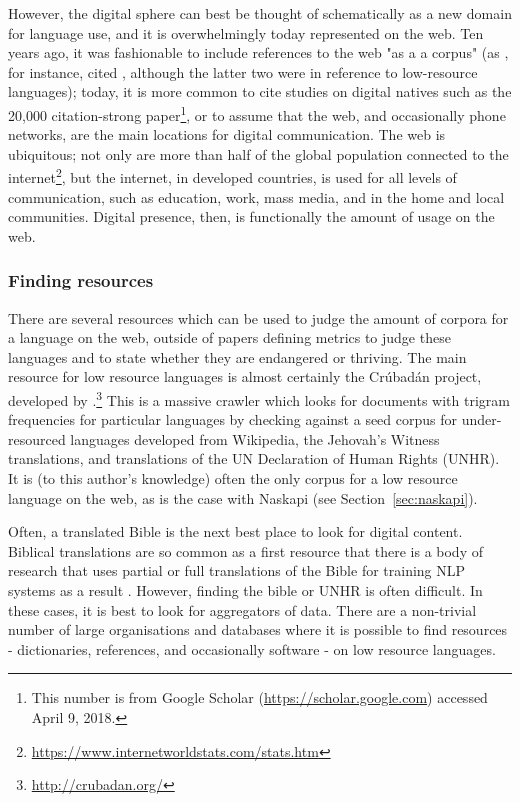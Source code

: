 However, the digital sphere can best be thought of schematically as a new domain for language use, and it is overwhelmingly today represented on the web. Ten years ago, it was fashionable to include references to the web "as a a corpus" (as \citet{scannell2007crubadan}, for instance, cited \citep{resnik1999mining, ghani2001mining, kilgarriff2001web}, although the latter two were in reference to low-resource languages); today, it is more common to cite studies on digital natives such as the 20,000 citation-strong \citet{prensky2001digital} paper\footnote{This number is from Google Scholar (\href{https://scholar.google.com}{https://scholar.google.com}) accessed April 9, 2018.}, or to assume that the web, and occasionally phone networks, are the main locations for digital communication. The web is ubiquitous; not only are more than half of the global population connected to the internet\footnote{\href{https://www.internetworldstats.com/stats.htm}{https://www.internetworldstats.com/stats.htm}}, but the internet, in developed countries, is used for all levels of communication, such as education, work, mass media, and in the home and local communities. Digital presence, then, is functionally the amount of usage on the web.

\subsubsection{Finding resources}
\label{subsec:finding-resources}

There are several resources which can be used to judge the amount of corpora for a language on the web, outside of papers defining metrics to judge these languages and to state whether they are endangered or thriving. The main resource for low resource languages is almost certainly the Cr\'ubad\'an project, developed by \citet{scannell2007crubadan}.\footnote{\href{http://crubadan.org/}{http://crubadan.org/}} This is a massive crawler which looks for documents with trigram frequencies for particular languages by checking against a seed corpus for under-resourced languages developed from Wikipedia, the Jehovah's Witness translations, and translations of the UN Declaration of Human Rights (UNHR). It is (to this author's knowledge) often the only corpus for a low resource language on the web, as is the case with Naskapi (see Section~\ref{sec:naskapi}).

Often, a translated Bible is the next best place to look for digital content. Biblical translations are so common as a first resource that there is a body of research that uses partial or full translations of the Bible for training NLP systems as a result \citep{chew2006evaluation}. However, finding the bible or UNHR is often difficult. In these cases, it is best to look for aggregators of data. There are a non-trivial number of large organisations and databases where it is possible to find resources - dictionaries, references, and occasionally software - on low resource languages.

